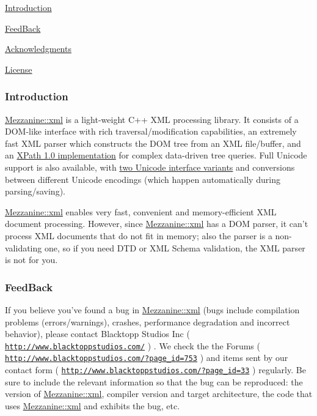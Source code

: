 \begin{DoxyItemize}
\item \hyperlink{XMLManual_XMLIntroduction}{Introduction}
\item \hyperlink{XMLManual_XMLFeedBack}{FeedBack}
\item \hyperlink{XMLManual_XMLAcknowledgments}{Acknowledgments}
\item \hyperlink{XMLManual_XMLLicense}{License}
\end{DoxyItemize}\hypertarget{XMLManual_XMLIntroduction}{}\subsubsection{Introduction}\label{XMLManual_XMLIntroduction}
\hyperlink{namespaceMezzanine_1_1xml}{Mezzanine::xml} is a light-\/weight C++ XML processing library. It consists of a DOM-\/like interface with rich traversal/modification capabilities, an extremely fast XML parser which constructs the DOM tree from an XML file/buffer, and an \hyperlink{classMezzanine_1_1xml_1_1XPathQuery}{XPath 1.0 implementation} for complex data-\/driven tree queries. Full Unicode support is also available, with \hyperlink{XMLManual_XMLUnicode}{two Unicode interface variants} and conversions between different Unicode encodings (which happen automatically during parsing/saving). \par
 \par
 \hyperlink{namespaceMezzanine_1_1xml}{Mezzanine::xml} enables very fast, convenient and memory-\/efficient XML document processing. However, since \hyperlink{namespaceMezzanine_1_1xml}{Mezzanine::xml} has a DOM parser, it can't process XML documents that do not fit in memory; also the parser is a non-\/validating one, so if you need DTD or XML Schema validation, the XML parser is not for you. \par
 \par
 \hypertarget{XMLManual_XMLFeedBack}{}\subsubsection{FeedBack}\label{XMLManual_XMLFeedBack}
If you believe you've found a bug in \hyperlink{namespaceMezzanine_1_1xml}{Mezzanine::xml} (bugs include compilation problems (errors/warnings), crashes, performance degradation and incorrect behavior), please contact Blacktopp Studios Inc ( \href{http://www.blacktoppstudios.com/}{\tt http://www.blacktoppstudios.com/} ) . We check the the Forums ( \href{http://www.blacktoppstudios.com/?page_id=753}{\tt http://www.blacktoppstudios.com/?page\_\-id=753} ) and items sent by our contact form ( \href{http://www.blacktoppstudios.com/?page_id=33}{\tt http://www.blacktoppstudios.com/?page\_\-id=33} ) regularly. Be sure to include the relevant information so that the bug can be reproduced: the version of \hyperlink{namespaceMezzanine_1_1xml}{Mezzanine::xml}, compiler version and target architecture, the code that uses \hyperlink{namespaceMezzanine_1_1xml}{Mezzanine::xml} and exhibits the bug, etc. \par
